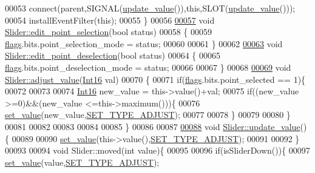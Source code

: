 \begin{DoxyCode}
00053     connect(parent,SIGNAL(\hyperlink{a00024_a4f62a01554ee8d975abe0cb136937695}{update\_value}()),\textcolor{keyword}{this},SLOT(\hyperlink{a00024_a4f62a01554ee8d975abe0cb136937695}{update\_value}()));
00054     installEventFilter(\textcolor{keyword}{this});
00055 \}
00056 
\hypertarget{a00046_source_l00057}{}\hyperlink{a00024_adeebaace74ff3add2acd9147e96fc0a6}{00057} \textcolor{keywordtype}{void} \hyperlink{a00024_adeebaace74ff3add2acd9147e96fc0a6}{Slider::edit\_point\_selection}(\textcolor{keywordtype}{bool} status)
00058 \{
00059     \hyperlink{a00024_ade6449558d429b66e5ed1381bc9b9060}{flags}.bits.point\_selection\_mode = status;
00060 
00061 \}
00062 
\hypertarget{a00046_source_l00063}{}\hyperlink{a00024_a105dff1f3ae7cfdcfabacd013428a501}{00063} \textcolor{keywordtype}{void} \hyperlink{a00024_a105dff1f3ae7cfdcfabacd013428a501}{Slider::edit\_point\_deselection}(\textcolor{keywordtype}{bool} status)
00064 \{
00065     \hyperlink{a00024_ade6449558d429b66e5ed1381bc9b9060}{flags}.bits.point\_deselection\_mode = status;
00066 
00067 \}
00068 
\hypertarget{a00046_source_l00069}{}\hyperlink{a00024_a521ac5143857dd652a0bafa77389fa81}{00069} \textcolor{keywordtype}{void} \hyperlink{a00024_a521ac5143857dd652a0bafa77389fa81}{Slider::adjust\_value}(\hyperlink{a00001_a3985266aecb120f269789241c170850c}{Int16} val)
00070 \{
00071     \textcolor{keywordflow}{if}(\hyperlink{a00024_ade6449558d429b66e5ed1381bc9b9060}{flags}.bits.point\_selected == 1)\{
00072 
00073 
00074     \hyperlink{a00001_a3985266aecb120f269789241c170850c}{Int16} new\_value = this->value()+val;
00075     \textcolor{keywordflow}{if}((new\_value >=0)&&(new\_value <=this->maximum()))\{
00076         \hyperlink{a00024_ae3010d3de02715db2f443560d7d2a27b}{set\_value}(new\_value,\hyperlink{a00034_a16b6b7b5ad68ec0dd62a3c9e97f88adb}{SET\_TYPE\_ADJUST});
00077 
00078     \}
00079 
00080     \}
00081 
00082 
00083 
00084 
00085 \}
00086 
00087 
\hypertarget{a00046_source_l00088}{}\hyperlink{a00024_a4f62a01554ee8d975abe0cb136937695}{00088} \textcolor{keywordtype}{void} \hyperlink{a00024_a4f62a01554ee8d975abe0cb136937695}{Slider::update\_value}()\{
00089 
00090     \hyperlink{a00024_ae3010d3de02715db2f443560d7d2a27b}{set\_value}(this->value(),\hyperlink{a00034_a16b6b7b5ad68ec0dd62a3c9e97f88adb}{SET\_TYPE\_ADJUST});
00091 
00092 \}
00093 
00094 \textcolor{keywordtype}{void} Slider::moved(\textcolor{keywordtype}{int} value)\{
00095 
00096     \textcolor{keywordflow}{if}(isSliderDown())\{
00097     \hyperlink{a00024_ae3010d3de02715db2f443560d7d2a27b}{set\_value}(value,\hyperlink{a00034_a16b6b7b5ad68ec0dd62a3c9e97f88adb}{SET\_TYPE\_ADJUST});

\end{DoxyCode}
